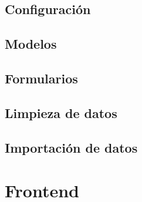 \subsection{Configuración}

\subsection{Modelos}

\subsection{Formularios}

\subsection{Limpieza de datos}

\subsection{Importación de datos}

\section{Frontend}


